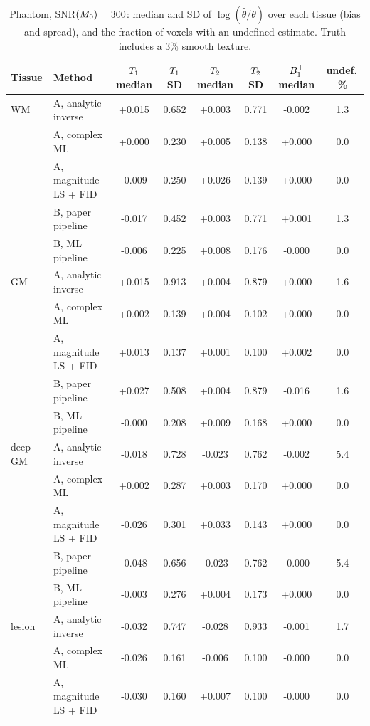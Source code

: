 \begin{table}[!htbp]
\centering
\caption{Phantom, SNR$(M_0)=300$: median and SD of $\log(\hat\theta/\theta)$ over each tissue (bias and spread), and the fraction of voxels with an undefined estimate. Truth includes a $3\%$ smooth texture.}
\label{tab:roi300}
\footnotesize
\setlength{\tabcolsep}{3.5pt}
\begin{tabular}{llcccccc}
\toprule
Tissue & Method & $T_1$ median & $T_1$ SD & $T_2$ median & $T_2$ SD & $B_1^{+}$ median & undef.\,\%\\
\midrule
WM & A, analytic inverse & +0.015 & 0.652 & +0.003 & 0.771 & -0.002 & 1.3\\
 & A, complex ML & +0.000 & 0.230 & +0.005 & 0.138 & +0.000 & 0.0\\
 & A, magnitude LS + FID & -0.009 & 0.250 & +0.026 & 0.139 & +0.000 & 0.0\\
 & B, paper pipeline & -0.017 & 0.452 & +0.003 & 0.771 & +0.001 & 1.3\\
 & B, ML pipeline & -0.006 & 0.225 & +0.008 & 0.176 & -0.000 & 0.0\\
\midrule
GM & A, analytic inverse & +0.015 & 0.913 & +0.004 & 0.879 & +0.000 & 1.6\\
 & A, complex ML & +0.002 & 0.139 & +0.004 & 0.102 & +0.000 & 0.0\\
 & A, magnitude LS + FID & +0.013 & 0.137 & +0.001 & 0.100 & +0.002 & 0.0\\
 & B, paper pipeline & +0.027 & 0.508 & +0.004 & 0.879 & -0.016 & 1.6\\
 & B, ML pipeline & -0.000 & 0.208 & +0.009 & 0.168 & +0.000 & 0.0\\
\midrule
deep GM & A, analytic inverse & -0.018 & 0.728 & -0.023 & 0.762 & -0.002 & 5.4\\
 & A, complex ML & +0.002 & 0.287 & +0.003 & 0.170 & +0.000 & 0.0\\
 & A, magnitude LS + FID & -0.026 & 0.301 & +0.033 & 0.143 & +0.000 & 0.0\\
 & B, paper pipeline & -0.048 & 0.656 & -0.023 & 0.762 & -0.000 & 5.4\\
 & B, ML pipeline & -0.003 & 0.276 & +0.004 & 0.173 & +0.000 & 0.0\\
\midrule
lesion & A, analytic inverse & -0.032 & 0.747 & -0.028 & 0.933 & -0.001 & 1.7\\
 & A, complex ML & -0.026 & 0.161 & -0.006 & 0.100 & -0.000 & 0.0\\
 & A, magnitude LS + FID & -0.030 & 0.160 & +0.007 & 0.100 & -0.000 & 0.0\\

\end{tabular}
\end{table}
